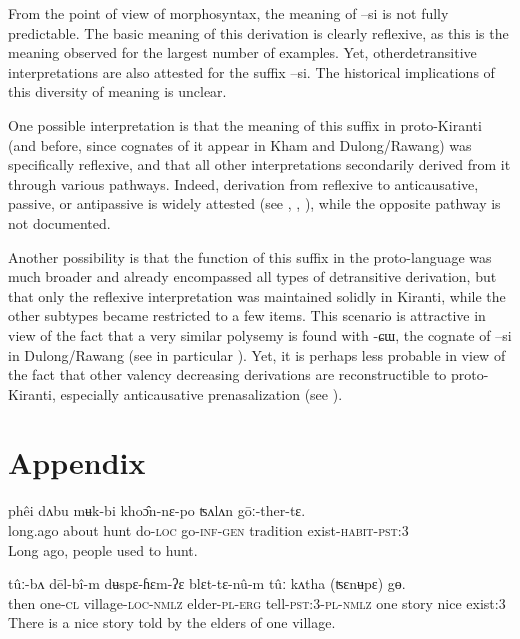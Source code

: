 \documentclass[twoside,a4paper,11pt]{article}
\newcommand{\ipa}[1]{{\phon#1}}
\begin{document}
From the point of view of morphosyntax, the meaning of  \ipa{--si}  is not fully predictable. The basic meaning of this derivation is clearly reflexive, as this is the meaning observed for the largest number of examples. Yet, otherdetransitive interpretations are also attested for the suffix \ipa{--si}. The historical implications of this diversity of meaning is unclear. 

One possible interpretation is that the meaning of this suffix in proto-Kiranti (and before, since cognates of it appear in Kham and Dulong/Rawang) was specifically reflexive, and that all other interpretations secondarily  derived from it through various pathways. Indeed, derivation from reflexive to anticausative, passive, or antipassive is widely attested (see \citealt{haspelmath90passive}, \citealt{nedjalkov07reciprocal}, \citealt{say09antipassive}), while the opposite pathway is not documented.


Another possibility is that the function of this suffix in the proto-language was much broader and already encompassed all types of detransitive  derivation, but that only the reflexive interpretation was maintained solidly in Kiranti, while the other subtypes became restricted to a few items. This scenario is attractive in view of the fact that a very similar polysemy is found with \ipa{-ɕɯ}, the cognate of \ipa{--si} in Dulong/Rawang (see in particular \citealt{lapolla05reflexive}). Yet, it is perhaps less probable in view of the fact that other valency decreasing derivations are reconstructible to proto-Kiranti, especially  anticausative prenasalization (see \citealt{jacques13derivational.khaling}). 

\section{Appendix}

\begin{exe}
\ex 
\gll \ipa{ʔʌnʌ̄m}  	\ipa{phêi}  \ipa{dʌbu}  	\ipa{mʉk-bi}  	\ipa{khoɔ̂n-nɛ-po}  	\ipa{ʦʌlʌn}  	\ipa{gōː-ther-tɛ.}  	\\
long.ago about hunt do-\textsc{loc} go-\textsc{inf-gen} tradition exist-\textsc{habit-pst:3} \\
\glt Long ago, people used to hunt.
\end{exe}
 

\begin{exe}
\ex 
\gll \ipa{mʌnʌ}  	\ipa{tûː-bʌ}  	\ipa{dēl-bî-m}  	\ipa{dʉspɛ-ɦɛm-ʔɛ}  	\ipa{blɛt-tɛ-nû-m}  	\ipa{tûː}  	\ipa{kʌtha}  	\ipa{(ʦɛnʉpɛ)}  	\ipa{gɵ.}   \\
then one-\textsc{cl} village-\textsc{loc-nmlz} elder-\textsc{pl-erg} tell-\textsc{pst:3-pl-nmlz} one story nice exist:3
\\
\glt There is a nice story told by the elders of one village.
\end{exe}
\end{document}
